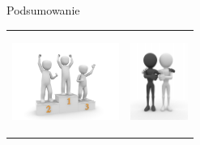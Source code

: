 \documentclass{beamer}
\begin{document}
\begin{frame}{}
\begin{center}
\huge{Podsumowanie}
\end{center}
\end{frame}

\begin{frame}{}
\begin{table}
     \begin{small}
	\begin{tabular}{ p{5cm} p{5cm} }
	
	\begin{minipage}{.5\textwidth}
	\begin{center}
  		\includegraphics[height=2.5cm]{PresentationWinner.jpg}
	\end{center}
   	 \end{minipage}
   	 &	
	\begin{minipage}{.5\textwidth}	
	\begin{center}
  		\includegraphics[height=2.5cm]{PresentationConnect.jpg}
	\end{center}
   	 \end{minipage}

	\end{tabular}
     \end{small}
\end{table}
\end{frame}
\end{document}
